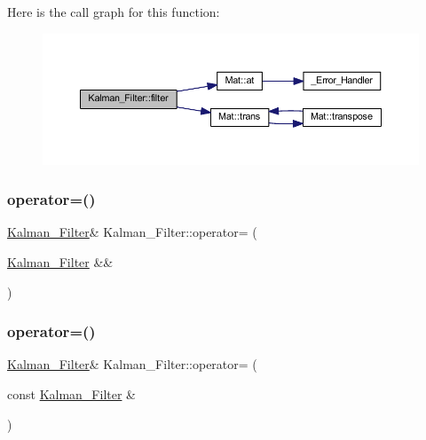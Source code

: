 Here is the call graph for this function\+:
\nopagebreak
\begin{figure}[H]
\begin{center}
\leavevmode
\includegraphics[width=350pt]{class_kalman___filter_a6ee45f2d0368a57b7ea49185a52d8175_cgraph}
\end{center}
\end{figure}
\mbox{\label{class_kalman___filter_abdea48a473c55bf2ddf8ded6a8c7ee78}} 
\subsubsection{\texorpdfstring{operator=()}{operator=()}\hspace{0.1cm}{\footnotesize\ttfamily [1/2]}}
{\footnotesize\ttfamily \mbox{\hyperlink{class_kalman___filter}{Kalman\+\_\+\+Filter}}\& Kalman\+\_\+\+Filter\+::operator= (\begin{DoxyParamCaption}\item[{\mbox{\hyperlink{class_kalman___filter}{Kalman\+\_\+\+Filter}} \&\&}]{ }\end{DoxyParamCaption})\hspace{0.3cm}{\ttfamily [default]}}

\mbox{\label{class_kalman___filter_a9873c96adf35331bbf61681895d585fd}} 
\subsubsection{\texorpdfstring{operator=()}{operator=()}\hspace{0.1cm}{\footnotesize\ttfamily [2/2]}}
{\footnotesize\ttfamily \mbox{\hyperlink{class_kalman___filter}{Kalman\+\_\+\+Filter}}\& Kalman\+\_\+\+Filter\+::operator= (\begin{DoxyParamCaption}\item[{const \mbox{\hyperlink{class_kalman___filter}{Kalman\+\_\+\+Filter}} \&}]{ }\end{DoxyParamCaption})\hspace{0.3cm}{\ttfamily [default]}}



